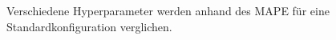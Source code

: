 \begin{figure}[hb!]
	\centering
	\caption{Verschiedene Hyperparameter werden anhand des MAPE für eine Standardkonfiguration verglichen.}
	\label{Vgl-HyperparameterII}
\end{figure}
